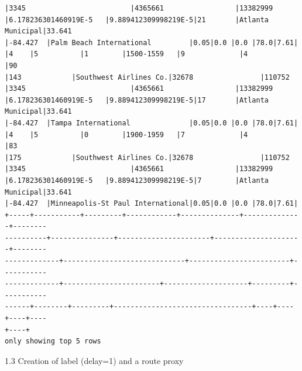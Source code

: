 \documentclass[11pt]{article}
\begin{document}
\begin{Verbatim}[commandchars=\\\{\}]
|3345                         |4365661                 |13382999
|6.178236301460919E-5   |9.889412309998219E-5|21       |Atlanta Municipal|33.641
|-84.427  |Palm Beach International         |0.05|0.0 |0.0 |78.0|7.61|
|4    |5          |1        |1500-1559   |9             |4             |90
|143            |Southwest Airlines Co.|32678                |110752
|3345                         |4365661                 |13382999
|6.178236301460919E-5   |9.889412309998219E-5|17       |Atlanta Municipal|33.641
|-84.427  |Tampa International              |0.05|0.0 |0.0 |78.0|7.61|
|4    |5          |0        |1900-1959   |7             |4             |83
|175            |Southwest Airlines Co.|32678                |110752
|3345                         |4365661                 |13382999
|6.178236301460919E-5   |9.889412309998219E-5|7        |Atlanta Municipal|33.641
|-84.427  |Minneapolis-St Paul International|0.05|0.0 |0.0 |78.0|7.61|
+-----+-----------+---------+------------+--------------+--------------+--------
----------+---------------+----------------------+---------------------+--------
-------------+-----------------------------+------------------------+-----------
-------------+-----------------------+--------------------+---------+-----------
------+--------+---------+---------------------------------+----+----+----+----
+----+
only showing top 5 rows

    \end{Verbatim}

    1.3 Creation of label (delay=1) and a route proxy
\end{document}
